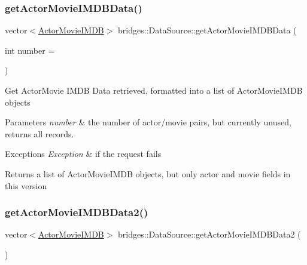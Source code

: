 \subsubsection{\texorpdfstring{get\+Actor\+Movie\+I\+M\+D\+B\+Data()}{getActorMovieIMDBData()}}
{\footnotesize\ttfamily vector$<$\hyperlink{classbridges_1_1dataset_1_1_actor_movie_i_m_d_b}{Actor\+Movie\+I\+M\+DB}$>$ bridges\+::\+Data\+Source\+::get\+Actor\+Movie\+I\+M\+D\+B\+Data (\begin{DoxyParamCaption}\item[{int}]{number = {} }\end{DoxyParamCaption})\hspace{0.3cm}{\ttfamily [inline]}}

Get Actor\+Movie I\+M\+DB Data retrieved, formatted into a list of Actor\+Movie\+I\+M\+DB objects


\begin{DoxyParams}{Parameters}
{\em number} & the number of actor/movie pairs, but currently unused, returns all records. \\
\hline
\end{DoxyParams}

\begin{DoxyExceptions}{Exceptions}
{\em Exception} & if the request fails\\
\hline
\end{DoxyExceptions}
\begin{DoxyReturn}{Returns}
a list of Actor\+Movie\+I\+M\+DB objects, but only actor and movie fields in this version 
\end{DoxyReturn}
\mbox{\label{classbridges_1_1_data_source_a00f0a0a1871d4864c6ccdd04195e0fb2}} 
\subsubsection{\texorpdfstring{get\+Actor\+Movie\+I\+M\+D\+B\+Data2()}{getActorMovieIMDBData2()}}
{\footnotesize\ttfamily vector$<$\hyperlink{classbridges_1_1dataset_1_1_actor_movie_i_m_d_b}{Actor\+Movie\+I\+M\+DB}$>$ bridges\+::\+Data\+Source\+::get\+Actor\+Movie\+I\+M\+D\+B\+Data2 (\begin{DoxyParamCaption}{ }\end{DoxyParamCaption})\hspace{0.3cm}{\ttfamily [inline]}}

